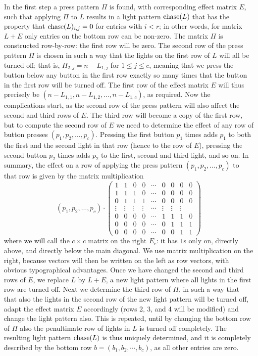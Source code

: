 In the first step a press pattern $\Pi$ is found,
with corresponding effect matrix $E$, such that applying
$\Pi$ to $L$ results in a light pattern $\operatorname{chase}(L)$ that has the property
that $\operatorname{chase}(L)_{i,j}=0$ for entries with $i<r$; in other words, 
for matrix $L+E$ only entries on the bottom row can be non-zero.
The matrix $\Pi$ is constructed 
row-by-row: the first row will be zero. The second row of the press pattern
$\Pi$ is chosen in such a way that the lights on the first row of $L$
will all be turned off; that is, $\Pi_{2,j}=n-L_{1,j}$ for $1\leq j\leq c$,
meaning that we press the button below any button in the first row exactly so many
times that the button in the first row will be turned off. The first row
of the effect matrix $E$ will thus precisely be $(n-L_{1,1}, n-L_{1,2},\ldots,
n-L_{1,c})$, as required. Now the complications start, as the second row
of the press pattern will also affect the second and third rows of $E$.
The third row will become a copy of the first row, but to compute the
second row of $E$ we need to determine the effect of any row of button presses
$(p_1, p_2, \ldots, p_c)$. Pressing the first button $p_1$ times adds $p_1$
to both the first and the second light in that row (hence to the row of $E$),
pressing the second button $p_2$ times adds $p_2$ to the first, second and third
light, and so on. In summary, the effect on a row of applying the press pattern
$(p_1, p_2, \ldots, p_c)$ to that row
is given by the matrix multiplication
$$(p_1, p_2, \ldots, p_c)\cdot
\begin{pmatrix}
1&1&0&0&\cdots&0&0&0&0\\
1&1&1&0&\cdots&0&0&0&0\\
0&1&1&1&\cdots&0&0&0&0\\
\vdots&\vdots&\vdots&\vdots&\cdots&\vdots&\vdots&\vdots\\
0&0&0&0&\cdots&1&1&1&0\\
0&0&0&0&\cdots&0&1&1&1\\
0&0&0&0&\cdots&0&0&1&1
\end{pmatrix}$$
where we will call the $c\times c$ matrix on the right $E_c$: it
has $1$s only on, directly above, and directly below the main diagonal.
We use matrix multiplication on the right, because vectors will then be
written on the left as row vectors, with obvious typographical advantages.
Once we have changed the second and third rows of $E$, we replace $L$
by $L+E$, a new light pattern where all lights in the first row are
turned off. Next we determine the third row of $\Pi$, in such a way that
that also the lights in the second row of the new light pattern will
be turned off, adapt the effect matrix $E$ accordingly (rows 2, 3, and 4
will be modified) and change the light pattern also. This is
repeated, until by changing the bottom row of $\Pi$ also the penultimate
row of lights in $L$ is turned off completely. The resulting
light pattern $\operatorname{chase}(L)$ is thus uniquely determined, and it is
completely described by the bottom row $b=(b_1, b_2, \cdots, b_c)$, as
all other entries are zero.

